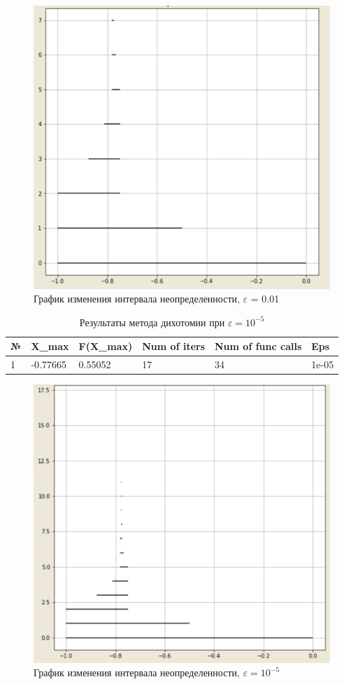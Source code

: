 \documentclass[10pt]{article}
\begin{document}
\begin{enumerate}
\begin{figure}[H]
\centering
\includegraphics[width=0.8\linewidth]{1.png}
\caption{График изменения интервала неопределенности, $\varepsilon$ = 0.01}
\label{fig:image1}
\end{figure}
\newpage


\begin{table}[H]
\caption{Результаты метода дихотомии при $\varepsilon = 10^{-5}$}
\begin{center}
\begin{tabular}{|l|l|l|l|l|l|}
\hline
№ & X\_max    & F(X\_max) & Num of iters & Num of func calls & Eps  \\
\hline
     1  & -0.77665 &   0.55052 &              17 &                   34 &
1e-05 \\
\hline
\end{tabular}
\end{center}
\end{table}

\begin{figure}[H]
\centering
\includegraphics[width=0.8\linewidth]{2.png}
\caption{График изменения интервала неопределенности, $\varepsilon = 10^{-5}$}
\label{fig:image1}
\end{figure}
\newpage


\end{enumerate}
\end{document}
